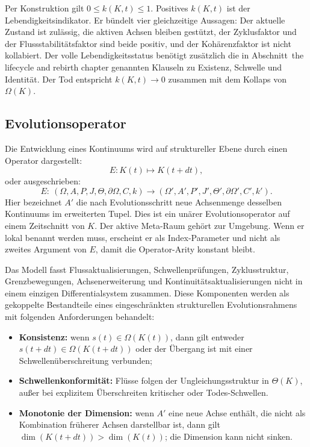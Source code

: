 Per Konstruktion gilt \(0 \le k(K,t) \le 1\).
Positives \(k(K,t)\) ist der Lebendigkeitsindikator. Er bündelt vier
gleichzeitige Aussagen: Der aktuelle Zustand ist zulässig, die aktiven Achsen
bleiben gestützt, der Zyklusfaktor und der Flussstabilitätsfaktor sind beide
positiv, und der Kohärenzfaktor ist nicht kollabiert. Der volle Lebendigkeitsstatus
benötigt zusätzlich die in Abschnitt~the lifecycle and rebirth chapter genannten Klauseln
zu Existenz, Schwelle und Identität.
Der Tod entspricht \(k(K,t)\to 0\) zusammen mit dem Kollaps von
\(\Omega(K)\).

\subsection{Evolutionsoperator}

Die Entwicklung eines Kontinuums wird auf struktureller Ebene durch einen Operator
dargestellt:
\[
    E: K(t) \mapsto K(t+dt),
\]
oder ausgeschrieben:
\[
    E:\ (\Omega,A,P,J,\Theta,\partial\Omega,C,k)
    \longrightarrow (\Omega',A',P',J',\Theta',\partial\Omega',C',k').
\]
Hier bezeichnet \(A'\) die nach Evolutionsschritt neue Achsenmenge desselben
Kontinuums im erweiterten Tupel.
Dies ist ein unärer Evolutionsoperator auf einem Zeitschnitt von \(K\). Der aktive
Meta-Raum gehört zur Umgebung. Wenn er lokal benannt werden muss, erscheint er als
Index-Parameter und nicht als zweites Argument von \(E\), damit die
Operator-Arity konstant bleibt.

Das Modell fasst Flussaktualisierungen, Schwellenprüfungen, Zyklusstruktur,
Grenzbewegungen, Achsenerweiterung und Kontinuitätsaktualisierungen nicht in
einem einzigen Differentialsystem zusammen. Diese Komponenten werden als
gekoppelte Bestandteile eines eingeschränkten strukturellen Evolutionsrahmens mit
folgenden Anforderungen behandelt:

\begin{itemize}
    \item \textbf{Konsistenz:} wenn \(s(t) \in \Omega(K(t))\), dann gilt entweder
          \(s(t+dt) \in \Omega(K(t+dt))\) oder der Übergang ist mit einer
          Schwellenüberschreitung verbunden;
    \item \textbf{Schwellenkonformität:} Flüsse folgen der Ungleichungsstruktur
          in \(\Theta(K)\), außer bei explizitem Überschreiten kritischer
          oder Todes-Schwellen.
    \item \textbf{Monotonie der Dimension:} wenn \(A'\) eine neue Achse enthält,
die nicht als Kombination früherer Achsen darstellbar ist, dann gilt
          \(\dim(K(t+dt)) > \dim(K(t))\); die Dimension kann nicht sinken.
\end{itemize}

